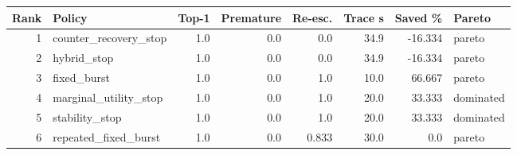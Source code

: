 \begin{tabular}{rlrrrrrl}
\hline
Rank & Policy & Top-1 & Premature & Re-esc. & Trace s & Saved \% & Pareto \\
\hline
1 & counter_recovery_stop & 1.0 & 0.0 & 0.0 & 34.9 & -16.334 & pareto \\
2 & hybrid_stop & 1.0 & 0.0 & 0.0 & 34.9 & -16.334 & pareto \\
3 & fixed_burst & 1.0 & 0.0 & 1.0 & 10.0 & 66.667 & pareto \\
4 & marginal_utility_stop & 1.0 & 0.0 & 1.0 & 20.0 & 33.333 & dominated \\
5 & stability_stop & 1.0 & 0.0 & 1.0 & 20.0 & 33.333 & dominated \\
6 & repeated_fixed_burst & 1.0 & 0.0 & 0.833 & 30.0 & 0.0 & pareto \\
\hline
\end{tabular}
